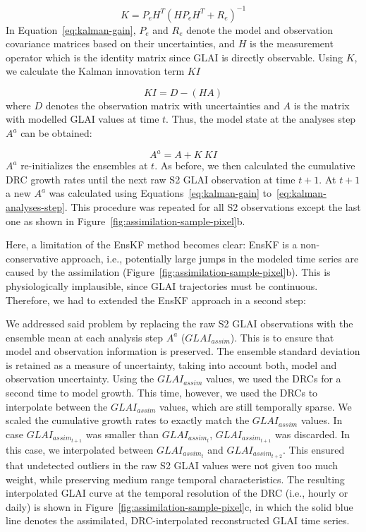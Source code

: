 \begin{equation}
\label{eq:kalman-gain}
    K = P_e H^T (H P_e H^T + R_e)^{-1}
\end{equation}
In Equation~\ref{eq:kalman-gain}, $P_e$ and $R_e$ denote the model and observation covariance matrices based on their uncertainties, and $H$ is the measurement operator which is the identity matrix since \gls{GLAI} is directly observable. Using $K$, we calculate the Kalman innovation term $KI$

\begin{equation}
    KI = D - (H A)
\end{equation}
where $D$ denotes the observation matrix with uncertainties and $A$ is the matrix with modelled \gls{GLAI} values at time $t$. Thus, the model state at the analyses step $A^a$ can be obtained:

\begin{equation}
\label{eq:kalman-analyses-step}
    A^a = A + K\ KI
\end{equation}
$A^a$ re-initializes the ensembles at $t$. As before, we then calculated the cumulative \gls{DRC} growth rates until the next raw \gls{S2} \gls{GLAI} observation at time $t+1$. At $t+1$ a new $A^a$ was calculated using Equations~\ref{eq:kalman-gain} to~\ref{eq:kalman-analyses-step}. This procedure was repeated for all \gls{S2} observations except the last one as shown in Figure~\ref{fig:assimilation-sample-pixel}b.

Here, a limitation of the \gls{EnsKF} method becomes clear: \gls{EnsKF} is a non-conservative approach, i.e., potentially large jumps in the modeled time series are caused by the assimilation (Figure~\ref{fig:assimilation-sample-pixel}b). This is physiologically implausible, since GLAI trajectories must be continuous. Therefore, we had to extended the EnsKF approach in a second step:

We addressed said problem by replacing the raw \gls{S2} \gls{GLAI} observations with the ensemble mean at each analysis step $A^a$ ($GLAI_{assim}$). This is to ensure that model and observation information is preserved. The ensemble standard deviation is retained as a measure of uncertainty, taking into account both, model and observation uncertainty. Using the $GLAI_{assim}$ values, we used the \gls{DRC}s for a second time to model growth. This time, however, we used the \gls{DRC}s to interpolate between the $GLAI_{assim}$ values, which are still temporally sparse. We scaled the cumulative growth rates to exactly match the $GLAI_{assim}$ values. In case $GLAI_{{assim}_{t+1}}$ was smaller than $GLAI_{{assim}_{t}}$, $GLAI_{{assim}_{t+1}}$ was discarded. In this case, we interpolated between $GLAI_{{assim}_t}$ and $GLAI_{{assim}_{t+2}}$. This ensured that undetected outliers in the raw \gls{S2} \gls{GLAI} values were not given too much weight, while preserving medium range temporal characteristics. The resulting interpolated \gls{GLAI} curve at the temporal resolution of the \gls{DRC} (i.e., hourly or daily) is shown in Figure~\ref{fig:assimilation-sample-pixel}c, in which the solid blue line denotes the assimilated, \gls{DRC}-interpolated reconstructed \gls{GLAI} time series.

